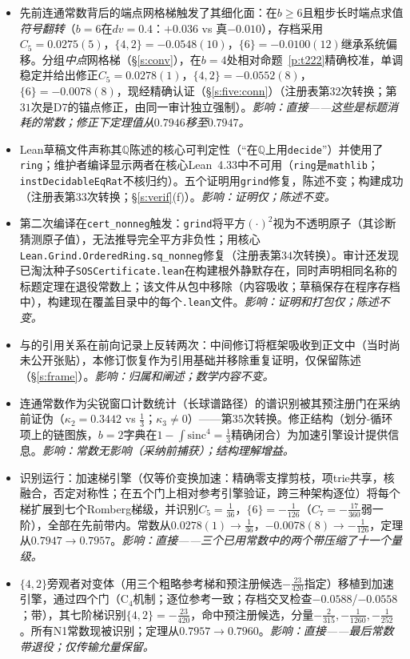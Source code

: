 \documentclass[11pt]{article}
\numberwithin{equation}{section}
\theoremstyle{definition}
\theoremstyle{remark}
\begin{document}
\begin{itemize}
\item[D10.] 先前连通常数背后的端点网格梯触发了其细化面：在$b\ge6$且粗步长时端点求值\emph{符号翻转}（$b=6$在$dv=0.4$：$+0.036$ vs 真$-0.010$），存档采用$C_5=0.0275(5)$，$\{4,2\}=-0.0548(10)$，$\{6\}=-0.0100(12)$继承系统偏移。分组\emph{中点}网格梯（\S\ref{s:conv}），在$b=4$处相对命题~\ref{p:t222}精确校准，单调稳定并给出修正$C_5=0.0278(1)$，$\{4,2\}=-0.0552(8)$，$\{6\}=-0.0078(8)$，现经精确认证（\S\ref{s:five:conn}）（注册表第$32$次转换；第$31$次是D7的锚点修正，由同一审计独立强制）。\emph{影响：直接——这些是标题消耗的常数；修正下定理值从$0.7946$移至$0.7947$。}
\item[D11.] Lean草稿文件声称其$\mathbb Q$陈述的核心可判定性（“在$\mathbb Q$上用\texttt{decide}”）并使用了\texttt{ring}；维护者编译显示两者在核心Lean~4.33中不可用（\texttt{ring}是\texttt{mathlib}；\texttt{instDecidableEqRat}不核归约）。五个证明用\texttt{grind}修复，陈述不变；构建成功（注册表第$33$次转换；\S\ref{s:verif}(f)）。\emph{影响：证明仅；陈述不变。}
\item[D12.] 第二次编译在\texttt{cert\_nonneg}触发：\texttt{grind}将平方$(\cdot)^2$视为不透明原子（其诊断猜测原子值），无法推导完全平方非负性；用核心\texttt{Lean.Grind.OrderedRing.sq\_nonneg}修复（注册表第$34$次转换）。审计还发现已淘汰种子\texttt{SOSCertificate.lean}在构建根外静默存在，同时声明相同名称的标题定理在退役常数上；该文件从包中移除（内容吸收；草稿保存在程序存档中），构建现在覆盖目录中的每个\texttt{.lean}文件。\emph{影响：证明和打包仅；陈述不变。}
\item[D13.] 与\cite{C26}的引用关系在前向记录上反转两次：中间修订将框架吸收到正文中（当时\cite{C26}尚未公开张贴），本修订恢复\cite{C26}作为引用基础并移除重复证明，仅保留陈述（\S\ref{s:frame}）。\emph{影响：归属和阐述；数学内容不变。}
\item[D14.] 连通常数作为尖锐窗口计数统计（长球谱路径）的谱识别被其预注册门在采纳前证伪（$\kappa_2=0.3442$ vs $\tfrac13$；$\kappa_3\ne0$）——第$35$次转换。修正结构（划分-循环项上的链图族，$b=2$字典在$1-\int\mathrm{sinc}^4=\tfrac13$精确闭合）为加速引擎设计提供信息。\emph{影响：常数无影响（采纳前捕获）；结构理解增益。}
\item[D15.] 识别运行：加速梯引擎（仅等价变换加速：精确零支撑剪枝，项trie共享，核融合，否定对称性；在五个门上相对参考引擎验证，跨三种架构逐位）将每个梯扩展到七个Romberg梯级，并识别$C_5=\tfrac1{36}$，$\{6\}=-\tfrac1{126}$（$C_7=-\tfrac{17}{360}$弱一阶），全部在先前带内。常数从$0.0278(1)\to\tfrac1{36}$，$-0.0078(8)\to-\tfrac1{126}$，定理从$0.7947\to0.7957$。\emph{影响：直接——三个已用常数中的两个带压缩了十一个量级。}
\item[D16.] $\{4,2\}$旁观者对变体（用三个粗略参考梯和预注册候选$-\tfrac{23}{420}$指定）移植到加速引擎，通过四个门（C$_4$机制；逐位参考一致；存档交叉检查$-0.0588$/$-0.0558$；带），其七阶梯识别$\{4,2\}=-\tfrac{23}{420}$，命中预注册候选，分量$-\tfrac2{315},-\tfrac1{1260},-\tfrac1{252}$。所有N1常数现被识别；定理从$0.7957\to0.7960$。\emph{影响：直接——最后常数带退役；仅传输允量保留。}

\end{itemize}
\end{document}
